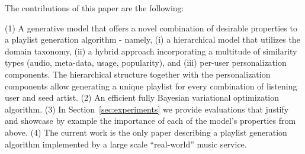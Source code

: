 The contributions of this paper are the following:

(1) A generative model that offers a novel combination of desirable properties to a playlist generation algorithm - namely, (i) a hierarchical model that utilizes the domain taxonomy, (ii) a hybrid approach incorporating a multitude of similarity types (audio, meta-data, usage, popularity), and (iii) per-user personalization components. The hierarchical structure together with the personalization components allow generating a unique playlist for every combination of listening user and seed artist. 
(2) An efficient fully Bayesian variational optimization algorithm. %
(3) In Section~\ref{sec:experiments} we provide evaluations that justify and showcase by example the importance of each of the model's properties from above. 
(4) The current work is the only paper describing a playlist generation algorithm implemented by a large scale ``real-world'' music service.
 



